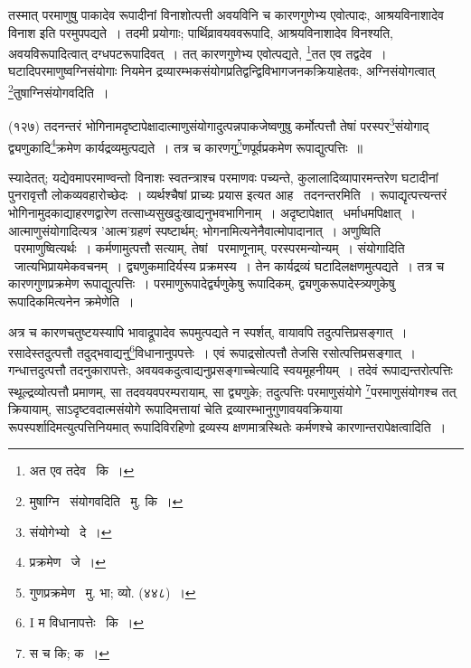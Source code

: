 \documentclass[11pt, openany]{book}
\begin{document}
{तस्मात् परमाणुषु पाकादेव रूपादीनां विनाशोत्पत्ती अवयविनि च कारणगुणेभ्य एवोत्पादः, आश्रयविनाशादेव विनाश इति परमुपपद्यते~। तदमी प्रयोगाः; पार्थिव्रावयववरूपादि, आश्रयविनाशादेव विनश्यति, अवयविरूपादित्वात् दग्धपटरूपादिवत्~। तत् कारणगुणेभ्य एवोत्पद्यते, \renewcommand{\thefootnote}{2}\footnote{अत एव तदेव \textendash\ कि~।}तत एव तद्वदेव~। घटादिपरमाणुष्वग्निसंयोगाः नियमेन द्रव्यारम्भकसंयोगप्रतिद्वन्द्विविभागजनकक्रियाहेतवः, अग्निसंयोगत्वात् \renewcommand{\thefootnote}{3}\footnote{मुषाग्नि \textendash\ संयोगवदिति \textendash\ मु. कि~।}तुषाग्निसंयोगवदिति~। 

{\knu (१२७) तदनन्तरं भोगिनामदृष्टापेक्षादात्माणुसंयोगादुत्पन्नपाकजेष्वणुषु कर्मोत्पत्तौ तेषां परस्पर\renewcommand{\thefootnote}{4}\footnote{संयोगेभ्यो \textendash\ दे~।}संयोगाद् द्व्यणुकादि\renewcommand{\thefootnote}{5}\footnote{प्रक्रमेण \textendash\ जे~।}क्रमेण कार्यद्रव्यमुत्पद्यते~। तत्र च कारणगु\renewcommand{\thefootnote}{6}\footnote{गुणप्रक्रमेण \textendash\ मु. भा; व्यो. (४४८)~।}णपूर्वप्रकमेण रूपाद्युत्पत्तिः~॥}

स्यादेतत्; यद्येवमापरमाण्वन्तो विनाशः स्वतन्त्राश्च परमाणवः पच्यन्ते, कुलालादिव्यापारमन्तरेण घटादीनां पुनरावृत्तौ लोकव्यवहारोच्छेदः~। व्यर्थश्चैषां प्राच्यः प्रयास इत्यत आह \textendash\ {\knu तदनन्तरमिति~।} रूपाद्यृत्पत्त्यन्तरं भोगिनामुदकाद्याहरणद्वारेण तत्साध्यसुखदुःखाद्यनुभवभागिनाम्~। {\knu अदृष्टापेक्षात्} \textendash\ धर्माधमपिक्षात्~। आत्माणुसंयोगादित्यत्र 'आत्म'ग्रहणं स्पष्टार्थम्; भोगनामित्यनेनैवात्मोपादानात्~। {\knu अणुष्विति} \textendash\ परमाणुष्वित्यर्थः~। कर्मणामुत्पत्तौ सत्याम्, {\knu तेषां} \textendash\ परमाणूनाम्, परस्परमन्योन्यम्~। {\knu संयोगा}दिति \textendash\ जात्यभिप्रायमेकवचनम्~। द्व्यणुकमादिर्यस्य प्रक्रमस्य~। तेन कार्यद्रव्यं घटादिलक्षणमुत्पद्यते~। तत्र च कारणगुणप्रक्रमेण रूपाद्युत्पत्तिः~। परमाणुरूपादेर्द्व्यणुकेषु रूपादिकम्, द्व्यणुकरूपादेस्त्र्यणुकेषु रूपादिकमित्यनेन क्रमेणेति~।

\newpage
अत्र च कारणचतुष्टयस्यापि भावाद्रूपादेव रूपमुत्पद्यते न स्पर्शत्, वायावपि तदुत्पत्तिप्रसङ्गात्~। रसादेस्तदुत्पत्तौ तदुद्भवाद्यनु\renewcommand{\thefootnote}{1}\footnote{I म विधानापत्तेः \textendash\ कि~।}विधानानुपपत्तेः~। एवं रूपाद्रसोत्पत्तौ तेजसि रसोत्पत्तिप्रसङ्गात्~। गन्धात्तदुत्पत्तौ तदनुकारापत्तेः, अवयवकदुत्वाद्यनुप्रसङ्गाच्चेत्यादि स्वयमूहनीयम्~। तदेवं रूपाद्यन्तरोत्पत्तिः स्थूल्द्रव्योत्पत्तौ प्रमाणम्, सा तदवयवपरम्परायाम्, सा द्व्यणुके; तदुत्पत्तिः परमाणुसंयोगे \renewcommand{\thefootnote}{2}\footnote{स च कि; क~।}परमाणुसंयोगश्च तत् क्रियायाम्, साऽदृष्टवदात्मसंयोगे रूपादिमत्तायां चेति द्रव्यारम्भानुगुणावयवक्रियाया रूपस्पर्शादिमत्युत्पत्तिनियमात् रूपादिविरहिणो द्रव्यस्य क्षणमात्रस्थितेः कर्मणश्चे कारणान्तरापेक्षत्वादिति~।

}
\end{document}
